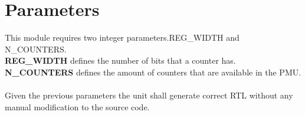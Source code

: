 \section{Parameters}
\label{chapter3}
This module requires two integer parameters.REG\_WIDTH and N\_COUNTERS. \\
\textbf{REG\_WIDTH} defines the number of bits that a counter has.\\
\textbf{N\_COUNTERS} defines the amount of counters that are available in the PMU.\\
\\
Given the previous parameters the unit shall generate correct RTL without any manual modification to the source code.\\
\\
